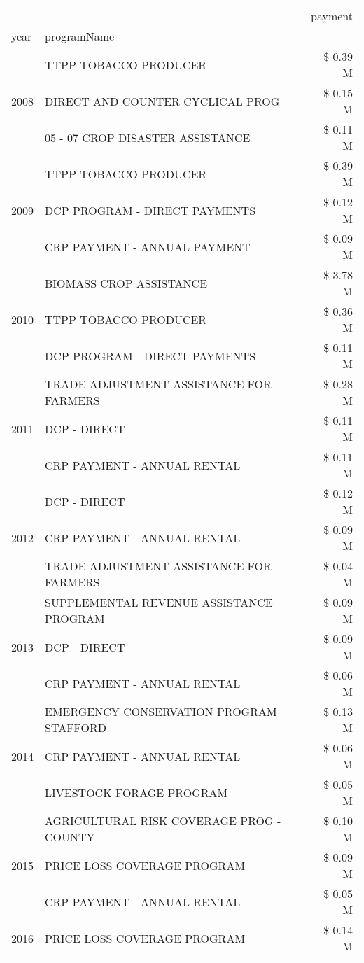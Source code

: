 \begin{tabular}{llr}
\toprule
 &  & payment \\
year & programName &  \\
\midrule
\multirow[t]{3}{*}{2008} & TTPP TOBACCO PRODUCER & \$ 0.39 M \\
 & DIRECT AND COUNTER CYCLICAL PROG & \$ 0.15 M \\
 & 05 - 07 CROP DISASTER ASSISTANCE & \$ 0.11 M \\
\cline{1-3}
\multirow[t]{3}{*}{2009} & TTPP TOBACCO PRODUCER & \$ 0.39 M \\
 & DCP PROGRAM - DIRECT PAYMENTS & \$ 0.12 M \\
 & CRP PAYMENT - ANNUAL PAYMENT & \$ 0.09 M \\
\cline{1-3}
\multirow[t]{3}{*}{2010} & BIOMASS CROP ASSISTANCE & \$ 3.78 M \\
 & TTPP TOBACCO PRODUCER & \$ 0.36 M \\
 & DCP PROGRAM - DIRECT PAYMENTS & \$ 0.11 M \\
\cline{1-3}
\multirow[t]{3}{*}{2011} & TRADE ADJUSTMENT ASSISTANCE FOR FARMERS & \$ 0.28 M \\
 & DCP - DIRECT & \$ 0.11 M \\
 & CRP PAYMENT - ANNUAL RENTAL & \$ 0.11 M \\
\cline{1-3}
\multirow[t]{3}{*}{2012} & DCP - DIRECT & \$ 0.12 M \\
 & CRP PAYMENT - ANNUAL RENTAL & \$ 0.09 M \\
 & TRADE ADJUSTMENT ASSISTANCE FOR FARMERS & \$ 0.04 M \\
\cline{1-3}
\multirow[t]{3}{*}{2013} & SUPPLEMENTAL REVENUE ASSISTANCE PROGRAM & \$ 0.09 M \\
 & DCP - DIRECT & \$ 0.09 M \\
 & CRP PAYMENT - ANNUAL RENTAL & \$ 0.06 M \\
\cline{1-3}
\multirow[t]{3}{*}{2014} & EMERGENCY CONSERVATION PROGRAM STAFFORD & \$ 0.13 M \\
 & CRP PAYMENT - ANNUAL RENTAL & \$ 0.06 M \\
 & LIVESTOCK FORAGE PROGRAM & \$ 0.05 M \\
\cline{1-3}
\multirow[t]{3}{*}{2015} & AGRICULTURAL RISK COVERAGE PROG - COUNTY & \$ 0.10 M \\
 & PRICE LOSS COVERAGE PROGRAM & \$ 0.09 M \\
 & CRP PAYMENT - ANNUAL RENTAL & \$ 0.05 M \\
\cline{1-3}
\multirow[t]{3}{*}{2016} & PRICE LOSS COVERAGE PROGRAM & \$ 0.14 M \\

\end{tabular}
